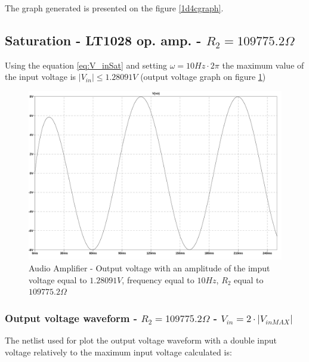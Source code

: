 \documentclass[10pt,a4paper]{article}
\begin{document}
The graph generated is presented on the figure \ref{1d4cgraph}.\\

\subsection{Saturation - LT1028 op. amp. - $R_2 = 109775.2\Omega$}
Using the equation \ref{eq:V_inSat} and setting $\omega = 10Hz \cdot 2\pi$ the maximum value of the input voltage is $|V_{in}| \leq 1.28091V$ (output voltage graph on figure \ref{1d5graph})

\begin{figure}[H]
  \centering
  \includegraphics[width=14cm]{graph/1d5.jpg}
  \caption{Audio Amplifier - Output voltage with an amplitude of the imput voltage equal to $1.28091V$, frequency equal to $10Hz$, $R_2$ equal to $109775.2\Omega$}
  \label{1d5graph}
\end{figure}

\subsubsection{Output voltage waveform - $R_2 = 109775.2\Omega$ - $V_{in} = 2 \cdot |V_{in MAX} |$}
The netlist used for plot the output voltage waveform with a double input voltage relatively to the maximum input voltage calculated is:\\

\end{document}
